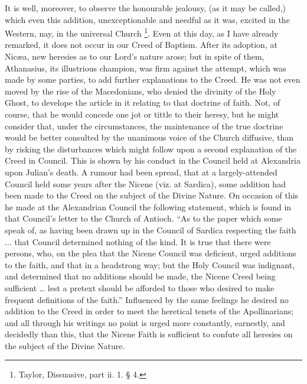 It is well, moreover, to observe the honourable jealousy, (as it
may be called,) which even this addition, unexceptionable and needful
as it was, excited in the Western, nay, in the universal Church \footnote{Taylor, Dissuasive, part ii. 1. § 4.}. Even at this day, as I have already remarked, it does not
occur in our Creed of Baptism. After its adoption, at Nicæa, new
heresies as to our Lord's nature arose; but in spite of them,
Athanasius, its illustrious champion, was firm against the attempt,
which was made by some parties, to add further explanations to the
Creed. He was not even moved by the rise of the Macedonians, who
denied the divinity of the Holy Ghost, to develope the article in it
relating to that doctrine of faith. Not, of course, that he would
concede one jot or tittle to their heresy, but he might consider that,
under the circumstances, the maintenance of the true doctrine would be
better consulted by the unanimous voice of the Church diffusive, than
by risking the disturbances which might follow upon a second
explanation of the Creed in Council. This is shown by his conduct in
the Council held at Alexandria upon Julian's death. A rumour had
been spread, that at a largely-attended Council held some years after
the Nicene (viz. at Sardica), some addition had been made to the Creed
on the subject of the Divine Nature. On occasion of this he made at
the Alexandrian Council the following statement, which is found in
that Council's letter to the Church of Antioch. ``As to the paper
which some speak of, as having been drawn up in the Council of Sardica
respecting the faith ... that Council determined nothing of the kind.
It is true that there were persons, who, on the plea that the Nicene
Council was deficient, urged additions to the faith, and that in a
headstrong way; but the Holy Council was indignant, and determined
that no additions should be made, the Nicene Creed being sufficient
… lest a pretext should be afforded to those who desired to make
frequent definitions of the faith.'' Influenced by the same
feelings he desired no addition to the Creed in order to meet the
heretical tenets of the Apollinarians; and all through his writings no
point is urged more constantly, earnestly, and decidedly than this,
that the Nicene Faith is sufficient to confute all heresies on the
subject of the Divine Nature.

